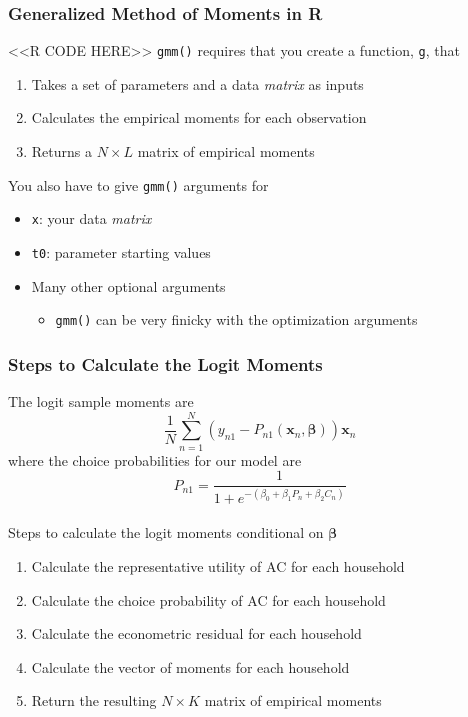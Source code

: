 \documentclass{beamer}
\begin{document}
\begin{frame}[fragile]\frametitle{Generalized Method of Moments in R}
    <<R CODE HERE>>
    \texttt{gmm()} requires that you create a function, \texttt{g}, that
    \begin{enumerate}
        \item Takes a set of parameters and a data \emph{matrix} as inputs
        \item Calculates the empirical moments for each observation
        \item Returns a $N \times L$ matrix of empirical moments
    \end{enumerate}
    You also have to give \texttt{gmm()} arguments for
    \begin{itemize}
        \item \texttt{x}: your data \emph{matrix}
        \item \texttt{t0}: parameter starting values
        \item Many other optional arguments
        \begin{itemize}
            \item \texttt{gmm()} can be very finicky with the optimization arguments
        \end{itemize}
    \end{itemize}
\end{frame}

\begin{frame}\frametitle{Steps to Calculate the Logit Moments}
    The logit sample moments are
    $$\frac{1}{N} \sum_{n = 1}^N \left( y_{n1} - P_{n1}(\bm{x}_n, \bm{\beta}) \right) \bm{x}_n$$
    where the choice probabilities for our model are
    $$P_{n1} = \frac{1}{1 + e^{-(\beta_0 + \beta_1 P_n + \beta_2 C_n)}}$$ \\
    \vspace{1ex}
    Steps to calculate the logit moments conditional on $\bm{\beta}$
    \begin{enumerate}
        \item Calculate the representative utility of AC for each household
        \item Calculate the choice probability of AC for each household
        \item Calculate the econometric residual for each household
        \item Calculate the vector of moments for each household
        \item Return the resulting $N \times K$ matrix of empirical moments
    \end{enumerate}
\end{frame}
\end{document}
